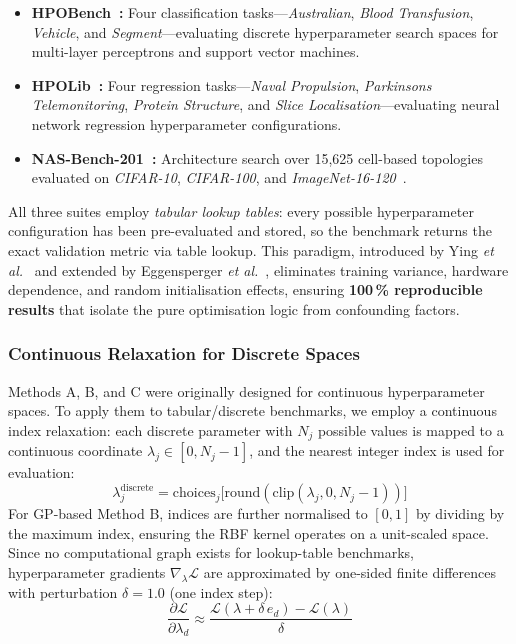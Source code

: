 \documentclass[11pt]{article}
\begin{document}
\begin{itemize}[leftmargin=*]
    \item \textbf{HPOBench~\cite{eggensperger2021,klein2019tabular}:}
          Four classification tasks---\emph{Australian},
          \emph{Blood Transfusion}, \emph{Vehicle}, and
          \emph{Segment}---evaluating discrete hyperparameter search spaces
          for multi-layer perceptrons and support vector machines.
    \item \textbf{HPOLib~\cite{klein2019tabular}:}
          Four regression tasks---\emph{Naval Propulsion},
          \emph{Parkinsons Telemonitoring}, \emph{Protein Structure},
          and \emph{Slice Localisation}---evaluating neural network
          regression hyperparameter configurations.
    \item \textbf{NAS-Bench-201~\cite{dong2020nasbench201}:}
          Architecture search over 15{,}625 cell-based topologies
          evaluated on \emph{CIFAR-10}, \emph{CIFAR-100}, and
          \emph{ImageNet-16-120}~\cite{chrabaszcz2017downsampled}.
\end{itemize}

All three suites employ \emph{tabular lookup tables}: every possible
hyperparameter configuration has been pre-evaluated and stored, so the
benchmark returns the exact validation metric via table lookup.
This paradigm, introduced by Ying \emph{et al.}~\cite{ying2019nasbench101}
and extended by Eggensperger \emph{et al.}~\cite{eggensperger2021},
eliminates training variance, hardware dependence, and random
initialisation effects, ensuring \textbf{100\,\% reproducible results}
that isolate the pure optimisation logic from confounding factors.

\subsubsection{Continuous Relaxation for Discrete Spaces}

Methods A, B, and C were originally designed for continuous
hyperparameter spaces.  To apply them to tabular/discrete benchmarks,
we employ a continuous index relaxation: each discrete parameter
with $N_j$ possible values is mapped to a continuous coordinate
$\lambda_j \in [0, N_j - 1]$, and the nearest integer index is
used for evaluation:
\begin{equation}
\lambda_j^{\mathrm{discrete}} = \mathrm{choices}_j\bigl[
   \mathrm{round}(\mathrm{clip}(\lambda_j, 0, N_j-1))\bigr]
\label{eq:index_relax}
\end{equation}
For GP-based Method B, indices are further normalised to $[0,1]$ by
dividing by the maximum index, ensuring the RBF kernel operates on
a unit-scaled space.  Since no computational graph exists for lookup-table
benchmarks, hyperparameter gradients $\nabla_\lambda\mathcal{L}$
are approximated by one-sided finite differences with perturbation
$\delta = 1.0$ (one index step):
\begin{equation}
\frac{\partial\mathcal{L}}{\partial\lambda_d}
  \approx \frac{\mathcal{L}(\lambda + \delta\,e_d) -
                \mathcal{L}(\lambda)}{\delta}
\label{eq:fd_grad}
\end{equation}
\end{document}
